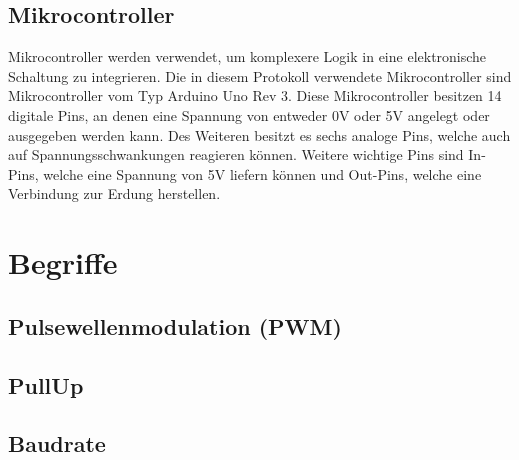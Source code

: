 \subsection{Mikrocontroller \cite{arduino-r3}}
\label{subsec:mikrocontroller}

Mikrocontroller werden verwendet, um komplexere Logik in eine elektronische Schaltung zu integrieren.
Die in diesem Protokoll verwendete Mikrocontroller sind Mikrocontroller vom Typ Arduino Uno Rev 3.
Diese Mikrocontroller besitzen 14 digitale Pins, an denen eine Spannung von entweder 0V oder 5V angelegt oder ausgegeben werden kann.
Des Weiteren besitzt es sechs analoge Pins, welche auch auf Spannungsschwankungen reagieren können.
Weitere wichtige Pins sind In-Pins, welche eine Spannung von 5V liefern können und Out-Pins, welche eine Verbindung zur Erdung herstellen.

\section{Begriffe}
\label{sec:begriffe}

\subsection{Pulsewellenmodulation (PWM)}
\label{subsec:pulsewellenmodulation-(pwm)}

\subsection{PullUp}
\label{subsec:pullup}

\subsection{Baudrate}
\label{subsec:baudrate}
